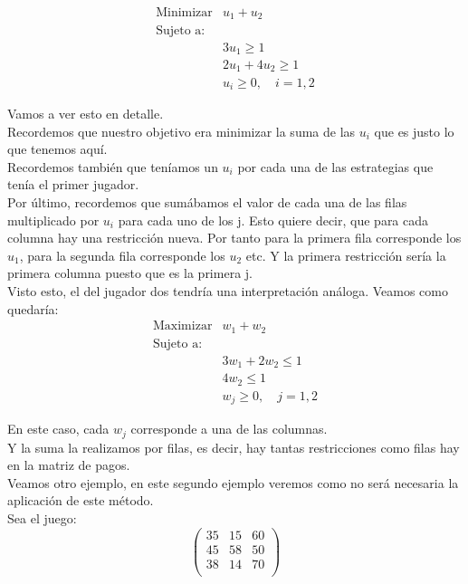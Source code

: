 \documentclass[10pt,a4paper]{book}
\begin{document}
$$\begin{array}{lc}
\mbox{Minimizar} & u_1 + u_2\\
\mbox{Sujeto a:}  \\
&  3u_1 \geq 1\\
& 2u_1 + 4u_2 \geq 1 \\
&u_i \geq 0, \quad i=1,2
\end{array}$$

Vamos a ver esto en detalle.\\
Recordemos que nuestro objetivo era minimizar la suma de las $u_i$ que es justo lo que tenemos aquí. \\
Recordemos también que teníamos un $u_i$ por cada una de las estrategias que tenía el primer jugador.\\

Por último, recordemos que sumábamos el valor de cada una de las filas multiplicado por $u_i$ para cada uno de los j. Esto quiere decir, que para cada columna hay una restricción nueva. Por tanto para la primera fila corresponde los $u_1$, para la segunda fila corresponde los $u_2$ etc. Y la primera restricción sería la primera columna puesto que es la primera j.\\

Visto esto, el del jugador dos tendría una interpretación análoga. Veamos como quedaría:\\

$$\begin{array}{lc}
\mbox{Maximizar} & w_1 + w_2\\
\mbox{Sujeto a:}  \\
&  3w_1 + 2w_2 \leq 1\\
&  4w_2 \leq 1 \\
&w_j \geq 0, \quad j=1,2
\end{array}$$

En este caso, cada $w_j$ corresponde a una de las columnas.\\
Y la suma la realizamos por filas, es decir, hay tantas restricciones como filas hay en la matriz de pagos.\\


Veamos otro ejemplo, en este segundo ejemplo veremos como no será necesaria la aplicación de este método.\\

Sea el juego:\\


$$
\left(
\begin{array}{cccc}
35 & 15 & 60  \\
45 & 58 & 50 \\
38 & 14 & 70\\
\end{array}
\right)
$$
\end{document}
